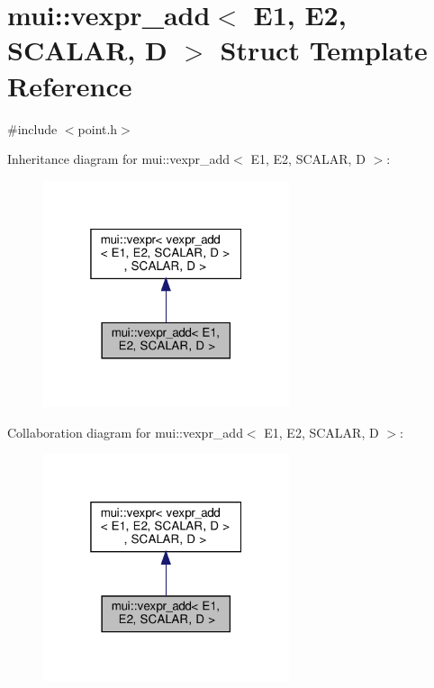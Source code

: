 \hypertarget{structmui_1_1vexpr__add}{}\section{mui\+:\+:vexpr\+\_\+add$<$ E1, E2, S\+C\+A\+L\+AR, D $>$ Struct Template Reference}
\label{structmui_1_1vexpr__add}


{\ttfamily \#include $<$point.\+h$>$}



Inheritance diagram for mui\+:\+:vexpr\+\_\+add$<$ E1, E2, S\+C\+A\+L\+AR, D $>$\+:
\nopagebreak
\begin{figure}[H]
\begin{center}
\leavevmode
\includegraphics[width=205pt]{structmui_1_1vexpr__add__inherit__graph}
\end{center}
\end{figure}


Collaboration diagram for mui\+:\+:vexpr\+\_\+add$<$ E1, E2, S\+C\+A\+L\+AR, D $>$\+:
\nopagebreak
\begin{figure}[H]
\begin{center}
\leavevmode
\includegraphics[width=205pt]{structmui_1_1vexpr__add__coll__graph}
\end{center}
\end{figure}
